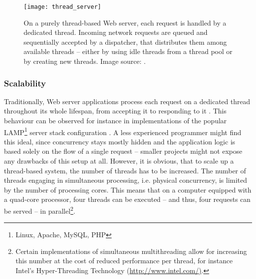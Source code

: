 \begin{figure}
\centering\small
\setlength{\tabcolsep}{0mm}
  \texttt{[image: thread\_server]}
\caption{
On a purely thread-based Web server, each request is handled by a dedicated thread. Incoming network requests are queued and sequentially accepted by a dispatcher, that distributes them among available threads -- either by using idle threads from a thread pool or by creating new threads. Image source: \cite{Welsh2001}.
}
\label{fig:thread_server}
\end{figure}

\subsubsection*{Scalability}
Traditionally, Web server applications process each request on a dedicated thread throughout its whole lifespan, from accepting it to responding to it \cite[p. 162]{Henderson2006}. This behaviour can be observed for instance in implementations of the popular LAMP\footnote{Linux, Apache, MySQL, PHP} server stack configuration \cite[p. 48]{Henderson2006}. A less experienced programmer might find this ideal, since concurrency stays mostly hidden and the application logic is based solely on the flow of a single request -- smaller projects might not expose any drawbacks of this setup at all. However, it is obvious, that to scale up a thread-based system, the number of threads has to be increased. The number of threads engaging in simultaneous processing, i.e. physical concurrency, is limited by the number of processing cores. This means that on a computer equipped with a quad-core processor, four threads can be executed -- and thus, four requests can be served -- in parallel\footnote{\label{lab:hyper}Certain implementations of simultaneous multithreading allow for increasing this number at the cost of reduced performance per thread, for instance Intel's Hyper-Threading Technology (\url{http://www.intel.com/)}.}.

